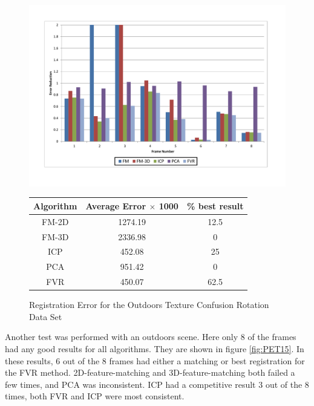 \begin{figure}
\centering
\includegraphics[width=6in]{images/results/Outside_TextureConfusion_Rotation}
\caption{Registration Error for the Outdoors Texture Confusion Rotation Data Set}
\label{fig:PET15}

\begin{tabular}{ccc}
\hline
\textbf{Algorithm} & \textbf{Average Error $\times$ 1000} & \textbf{\% best result}\\ \hline
FM-2D	& 1274.19 & 12.5\\
FM-3D	& 2336.98 & 0\\
ICP		& 452.08 & 25\\
PCA		& 951.42 & 0\\
FVR		& 450.07 & 62.5\\
\end{tabular}
\label{tab:PET15ST}
\end{figure}


Another test was performed with an outdoors scene. Here only 8 of the frames had any good results for all algorithms. They are shown in figure \ref{fig:PET15}. In these results, 6 out of the 8 frames had either a matching or best registration for the FVR method. 2D-feature-matching and 3D-feature-matching both failed a few times, and PCA was inconsistent. ICP had a competitive result 3 out of the 8 times, both FVR and ICP were most consistent. 


